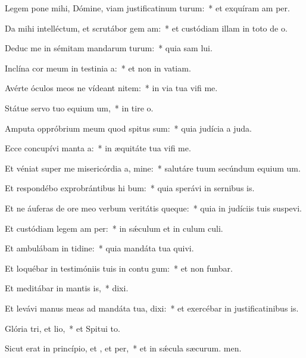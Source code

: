 \item Legem pone mihi, Dómine, viam justificatinum turum:~* et exquíram am per.
\item Da mihi intelléctum, et scrutábor gem am:~* et custódiam illam in toto de o.
\item Deduc me in sémitam mandarum turum:~* quia sam lui.
\item Inclína cor meum in testinia a:~* et non in vatiam.
\item Avérte óculos meos ne vídeant nitem:~* in via tua vifi me.
\item Státue servo tuo equium um,~* in tire o.
\item Amputa oppróbrium meum quod spitus sum:~* quia judícia a juda.
\item Ecce concupívi manta a:~* in æquitáte tua vifi me.
\item Et véniat super me misericórdia a, mine:~* salutáre tuum secúndum equium um.
\item Et respondébo exprobrántibus hi bum:~* quia sperávi in sernibus is.
\item Et ne áuferas de ore meo verbum veritátis queque:~* quia in judíciis tuis suspevi.
\item Et custódiam legem am per:~* in sǽculum et in culum culi.
\item Et ambulábam in tidine:~* quia mandáta tua quivi.
\item Et loquébar in testimóniis tuis in contu gum:~* et non funbar.
\item Et meditábar in mantis is,~*  dixi.
\item Et levávi manus meas ad mandáta tua,  dixi:~* et exercébar in justificatinibus is.
\item Glória tri, et lio,~* et Spitui to.
\item Sicut erat in princípio, et , et per,~* et in sǽcula sæcurum. men.
